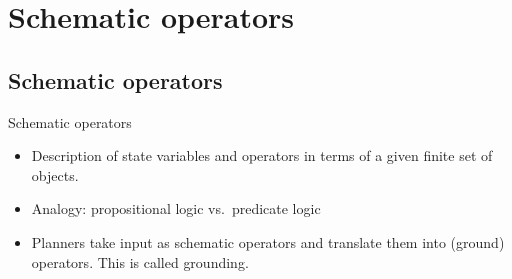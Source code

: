 \documentclass{gkibeamer}
\begin{document}
\subtitle{PDDL}
\date{October 28th, 2011}
\maketitles


\section{Schematic operators}
\subsection[Schemata]{Schematic operators}

\begin{frame}{Schematic operators}
  \begin{itemize}
  \item Description of state variables and operators in terms of a
    given finite \alert{set of objects}.
  \item Analogy: propositional logic vs.\ predicate logic
  \item Planners take input as schematic operators
    and translate them into (\alert{ground}) operators. This is called
    \alert{grounding}.
  \end{itemize}
\end{frame}
\end{document}
